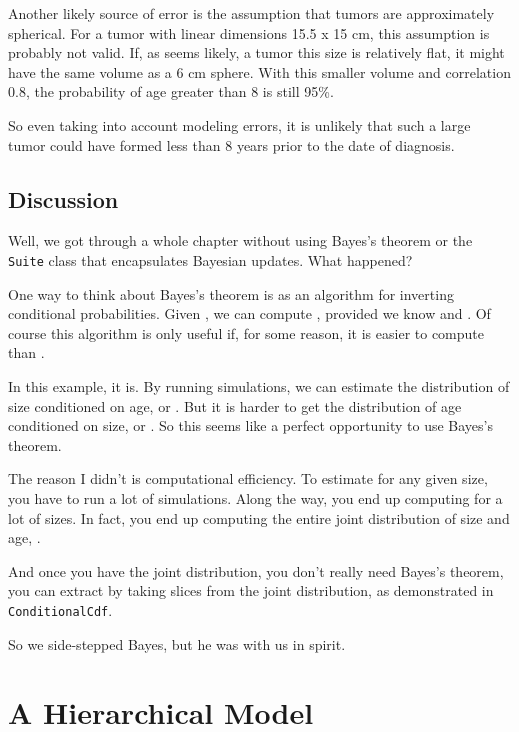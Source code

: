 \documentclass[12pt]{book}
\begin{document}
Another likely source of error is the assumption that tumors are
approximately spherical.  For a tumor with linear dimensions 15.5 x 15
cm, this assumption is probably not valid.  If, as seems likely, a
tumor this size
is relatively flat, it might have the same volume as a 6 cm sphere.
With this smaller volume and correlation 0.8, the probability of age
greater than 8 is still 95\%.

So even taking into account modeling errors, it is unlikely that such
a large tumor could have formed less than 8 years prior to the date of
diagnosis.


\section{Discussion}

Well, we got through a whole chapter without using Bayes's theorem or
the {\tt Suite} class that encapsulates Bayesian updates.  What
happened?

One way to think about Bayes's theorem is as an algorithm for
inverting conditional probabilities.  Given , we can compute
, provided we know  and .  Of course this algorithm
is only useful if, for some reason, it is easier to compute 
than .

In this example, it is.  By running simulations, we can estimate the
distribution of size conditioned on age, or .  But it is
harder to get the distribution of age conditioned on size, or
.  So this seems like a perfect opportunity to use Bayes's
theorem.

The reason I didn't is computational efficiency.  To estimate
 for any given size, you have to run a lot of simulations.
Along the way, you end up computing  for a lot of sizes.
In fact, you end up computing the entire joint distribution of size
and age, .

And once you have the joint distribution, you don't really need
Bayes's theorem, you can extract  by taking slices from
the joint distribution, as demonstrated in {\tt ConditionalCdf}.

So we side-stepped Bayes, but he was with us in spirit.


\chapter{A Hierarchical Model}
\label{hierarchical}
\end{document}
